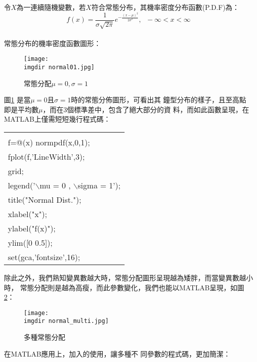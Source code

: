 \begin{enumerate}
{					令$X$為一連續隨機變數，若$X$符合常態分布，其機率密度分布函數(P.D.F)為：
					$$f(x)=\frac{1}{\sigma\sqrt{2\pi}}e^{-\frac{(x-\mu)^2}									{2\sigma^2}}, \;\; -\infty < x < \infty $$	
					\\
					常態分布的機率密度函數圖形：
					\begin{figure}[H]	
		 		 		\centering	 			 	 
   				 		\texttt{[image: \\imgdir normal01.jpg]} 
   			 			\caption{常態分配$\mu = 0 , \sigma = 1$}   		
   			 			\label{normal01}   			 		 
					\end{figure}
					\bigskip
					圖\ref{normal01} 是當$\mu = 0$且$\sigma = 1$時的常態分佈圖形，可看出其						鐘型分布的樣子，且至高點即是平均數$\mu$，而在3個標準差中，包含了絕大部分的資						料，而如此函數呈現，在MATLAB上僅需短短幾行程式碼：
					\begin{center}\colorbox{slight}{
						\begin{tabular}{p{}}
							\MJHmarker{\textbf{\color{darkblue}{MATLAB語法 :}}}\\		
							f=@(x) normpdf(x,0,1);\\
							fplot(f,'LineWidth',3);\\
							grid;\\
							legend('$\backslash$mu = 0 , $\backslash$sigma = 1');\\
							title("Normal Dist.");\\
							xlabel("x");\\
							ylabel("f(x)");\\
							ylim([0 0.5]);\\
							set(gca,'fontsize',16);	\\			
						\end{tabular}
					}
					\end{center}
					\bigskip				
					除此之外，我們熟知變異數越大時，常態分配圖形呈現越為矮胖，而當變異數越小時，						常態分配則是越為高瘦，而此參數變化，我們也能以MATLAB呈現，如圖									\ref{normal_multi}：
					\begin{figure}[H]	
		 		 		\centering	 			 	 
   				 		\texttt{[image: \\imgdir normal\_multi.jpg]} 
   			 			\caption{多種常態分配}   		
   			 			\label{normal_multi}   			 		 
					\end{figure}
					\bigskip
					在MATLAB應用上，加入\textbf{\color{darkblue}{for迴圈}}的使用，讓多種不						同參數的程式碼，更加簡潔：
					\begin{center}\colorbox{slight}{
						\begin{tabular}{p{}}

\end{tabular}}
\end{center}}
\end{enumerate}
